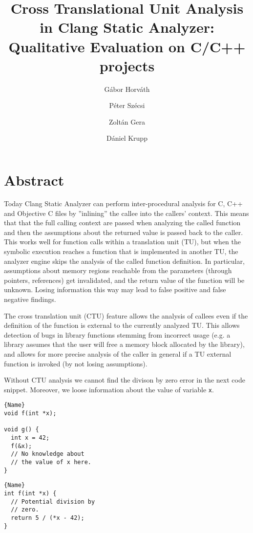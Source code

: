 \documentclass[sigconf]{acmart}
\title{Cross Translational Unit Analysis in Clang Static Analyzer: Qualitative Evaluation on C/C++ projects}
\author{G\'abor Horv\'ath}
\author{P\'eter Sz\'ecsi}
\author{Zolt\'an Gera}
\affiliation{%
  \institution{E\"otv\"os Lor\'and University, Department of Programming Languages and Compilers}
  \streetaddress{P\'azm\'any P\'eter st. 1/C.}
  \city{Budapest} 
  \country{Hungary} 
}
\author{D\'aniel Krupp}
\affiliation{%
  \institution{Ericsson Ltd.}
  \streetaddress{Magyar Tud\'osok k\"or\'utja 11.}
  \city{Budapest}
  \country{Hungary}
}
\begin{document}
\maketitle


\section{Abstract}
Today Clang Static Analyzer can perform inter-procedural analysis for 
C, C++ and Objective C files by ''inlining'' 
the callee into the callers' context. This means that that the full 
calling context are passed when 
analyzing the called function and
then the assumptions about the returned value is passed back to the caller. 
This works well for function calls within a
translation unit (TU), but when the symbolic execution reaches a function that 
is implemented in another TU, the analyzer engine 
skips the analysis of the called function definition. In particular,
assumptions about memory regions reachable from the parameters 
(through pointers, references) get invalidated, 
and the return value of the function will be unknown.
Losing information this way may lead to false positive
and false negative findings.

The cross translation unit (CTU) feature allows the analysis of callees
even if the definition of the function is external to the currently 
analyzed TU. This allows detection of bugs in library functions stemming
from incorrect usage (e.g. a library assumes that the user will free a memory 
block allocated by the library), and allows for more precise analysis
of the caller in general if a TU external function is invoked
(by not losing assumptions).

Without CTU analysis we cannot find the divison by zero error in the next 
code snippet. Moreover, we loose information about the value of variable
\texttt{x}.

\noindent\begin{minipage}{.48\columnwidth}
\begin{lstlisting}[caption=A.cpp,frame=tlrb]{Name}
void f(int *x);

void g() {
  int x = 42;
  f(&x);
  // No knowledge about
  // the value of x here.
}
\end{lstlisting}
\end{minipage}\hfill
\begin{minipage}{.48\columnwidth}
\begin{lstlisting}[caption=B.cpp,frame=tlrb]{Name}
int f(int *x) {
  // Potential division by
  // zero.
  return 5 / (*x - 42);
}
\end{lstlisting}
\end{minipage}
\end{document}
